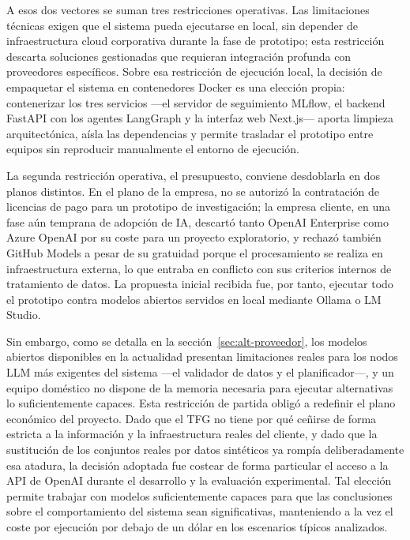 \documentclass[12pt,a4paper]{article}
\theoremstyle{plain}
\begin{document}
A esos dos vectores se suman tres restricciones operativas. Las limitaciones técnicas exigen que el sistema pueda ejecutarse en local, sin depender de infraestructura cloud corporativa durante la fase de prototipo; esta restricción descarta soluciones gestionadas que requieran integración profunda con proveedores específicos. Sobre esa restricción de ejecución local, la decisión de empaquetar el sistema en contenedores Docker es una elección propia: contenerizar los tres servicios ---el servidor de seguimiento MLflow, el backend FastAPI con los agentes LangGraph y la interfaz web Next.js--- aporta limpieza arquitectónica, aísla las dependencias y permite trasladar el prototipo entre equipos sin reproducir manualmente el entorno de ejecución.

La segunda restricción operativa, el presupuesto, conviene desdoblarla en dos planos distintos. En el plano de la empresa, no se autorizó la contratación de licencias de pago para un prototipo de investigación; la empresa cliente, en una fase aún temprana de adopción de IA, descartó tanto OpenAI Enterprise como Azure OpenAI por su coste para un proyecto exploratorio, y rechazó también GitHub Models a pesar de su gratuidad porque el procesamiento se realiza en infraestructura externa, lo que entraba en conflicto con sus criterios internos de tratamiento de datos. La propuesta inicial recibida fue, por tanto, ejecutar todo el prototipo contra modelos abiertos servidos en local mediante Ollama o LM Studio.

Sin embargo, como se detalla en la sección~\ref{sec:alt-proveedor}, los modelos abiertos disponibles en la actualidad presentan limitaciones reales para los nodos LLM más exigentes del sistema ---el validador de datos y el planificador---, y un equipo doméstico no dispone de la memoria necesaria para ejecutar alternativas lo suficientemente capaces. Esta restricción de partida obligó a redefinir el plano económico del proyecto. Dado que el TFG no tiene por qué ceñirse de forma estricta a la información y la infraestructura reales del cliente, y dado que la sustitución de los conjuntos reales por datos sintéticos ya rompía deliberadamente esa atadura, la decisión adoptada fue costear de forma particular el acceso a la API de OpenAI durante el desarrollo y la evaluación experimental. Tal elección permite trabajar con modelos suficientemente capaces para que las conclusiones sobre el comportamiento del sistema sean significativas, manteniendo a la vez el coste por ejecución por debajo de un dólar en los escenarios típicos analizados.%
\end{document}

